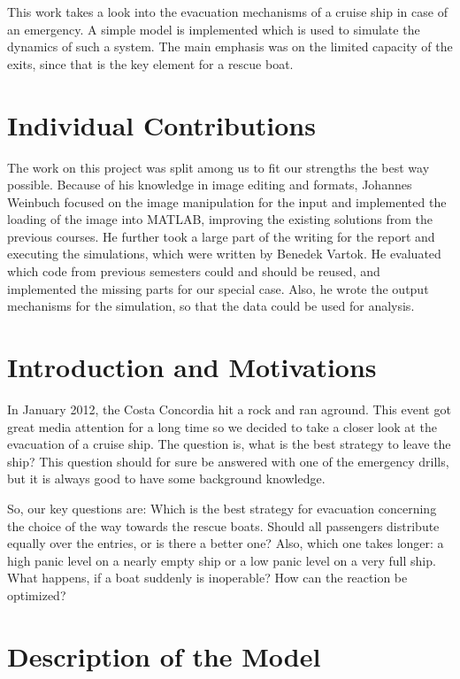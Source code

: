 \documentclass[11pt]{article}
\begin{document}
This work takes a look into the evacuation mechanisms of a cruise ship in case
of an emergency.  A simple model is implemented which is used to simulate the
dynamics of such a system.  The main emphasis was on the limited capacity of
the exits, since that is the key element for a rescue boat. 


\section{Individual Contributions}

The work on this project was split among us to fit our strengths the best way
possible.  Because of his knowledge in image editing and formats, Johannes
Weinbuch focused on the image manipulation for the input and implemented the
loading of the image into MATLAB, improving the existing solutions from the
previous courses. He further took a large part of the writing for the report
and executing the simulations, which were written by Benedek Vartok.  He
evaluated which code from previous semesters could and should be reused, and
implemented the missing parts for our special case.  Also, he wrote the output
mechanisms for the simulation, so that the data could be used for analysis.


\section{Introduction and Motivations}

In January 2012, the Costa Concordia hit a rock and ran aground\cite{bbcnews}.
This event got great media attention for a long time so we decided to take a
closer look at the evacuation of a cruise ship.  The question is, what is the
best strategy to leave the ship?  This question should for sure be answered with
one of the emergency drills, but it is always good to have some background
knowledge.

So, our key questions are: Which is the best strategy for evacuation concerning
the choice of the way towards the rescue boats. Should all passengers
distribute equally over the entries, or is there a better one? Also, which one
takes longer: a high panic level on a nearly empty ship or a low panic level on
a very full ship. What happens, if a boat suddenly is inoperable? How can the
reaction be optimized?


\section{Description of the Model}
\end{document}
